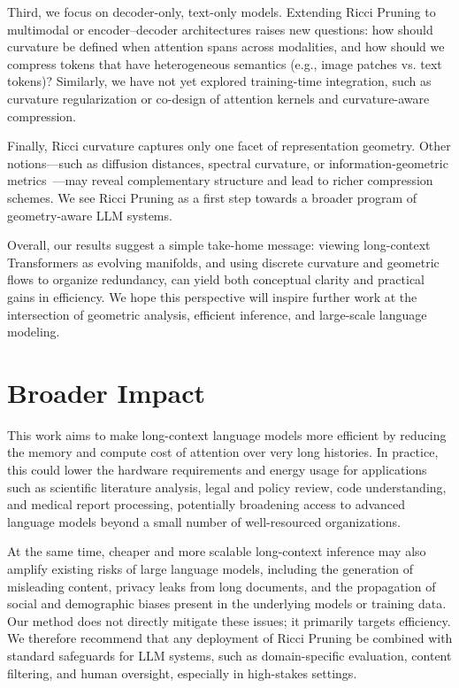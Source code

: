 \documentclass{article}
\theoremstyle{plain}
\theoremstyle{definition}
\theoremstyle{remark}
\begin{document}
Third, we focus on decoder-only, text-only models. Extending Ricci Pruning to multimodal or encoder--decoder architectures raises new questions: how should curvature be defined when attention spans across modalities, and how should we compress tokens that have heterogeneous semantics (e.g., image patches vs. text tokens)? Similarly, we have not yet explored training-time integration, such as curvature regularization or co-design of attention kernels and curvature-aware compression.

Finally, Ricci curvature captures only one facet of representation geometry. Other notions---such as diffusion distances, spectral curvature, or information-geometric metrics~\citep{akguller2025information,sadeghzadeh2025curvaturereview,yadav2025roadmap}---may reveal complementary structure and lead to richer compression schemes. We see Ricci Pruning as a first step towards a broader program of geometry-aware LLM systems.

Overall, our results suggest a simple take-home message: viewing long-context Transformers as evolving manifolds, and using discrete curvature and geometric flows to organize redundancy, can yield both conceptual clarity and practical gains in efficiency. We hope this perspective will inspire further work at the intersection of geometric analysis, efficient inference, and large-scale language modeling.


\section*{Broader Impact}

This work aims to make long-context language models more efficient by reducing the memory and compute cost of attention over very long histories. In practice, this could lower the hardware requirements and energy usage for applications such as scientific literature analysis, legal and policy review, code understanding, and medical report processing, potentially broadening access to advanced language models beyond a small number of well-resourced organizations.

At the same time, cheaper and more scalable long-context inference may also amplify existing risks of large language models, including the generation of misleading content, privacy leaks from long documents, and the propagation of social and demographic biases present in the underlying models or training data. Our method does not directly mitigate these issues; it primarily targets efficiency. We therefore recommend that any deployment of Ricci Pruning be combined with standard safeguards for LLM systems, such as domain-specific evaluation, content filtering, and human oversight, especially in high-stakes settings.
\end{document}
